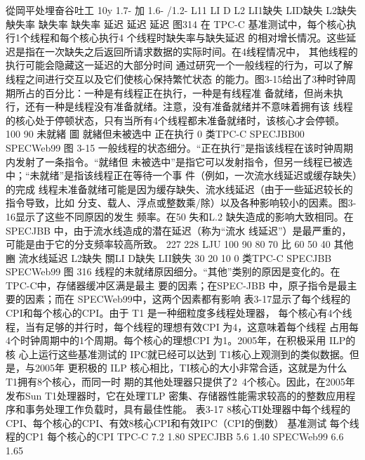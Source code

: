 從岡平处埋奋谷吐工
10y
1.7-
加 1.6-
/1.2-
L11
LI D
L2
LI1缺失 LID缺失 L2缺失
觖失率
缺失率
缺失率
延迟
延迟
延迟
图314
在 TPC-C 基准测试中，每个核心执行1个线程和每个核心执行4 个线程时缺失率与缺失延迟
的相对增长情况。这些延迟是指在一次缺失之后返回所请求数据的实际时间。在4线程情况中，
其他线程的执行可能会隐藏这一延迟的大部分时间
通过研究一个一般线程的行为，可以了解线程之间进行交互以及它们使核心保持繁忙状态
的能力。图3-15给出了3种时钟周期所占的百分比：一种是有线程正在执行，一种是有线程准
备就绪，但尚未执行，还有一种是线程没有准备就绪。注意，没有准备就绪并不意味着拥有该
线程的核心处于停顿状态，只有当所有4个线程都未准备就绪时，该核心才会停顿。
100%
90%
未就緒
圖 就緒但未被选中
正在执行
0%
类TPC-C
SPECJBB00
SPECWeb99
图 3-15 一般线程的状态细分。“正在执行”是指该线程在该时钟周期内发射了一条指令。“就绪但
未被选中”是指它可以发射指令，但另一线程已被选中；“未就绪”是指该线程正在等待一个事
件（例如，一次流水线延迟或缓存缺失）的完成
线程未准备就绪可能是因为缓存缺失、流水线延迟（由于一些延迟较长的指令导致，比如
分支、载人、浮点或整数乘/除）以及各种影响较小的因素。图3-16显示了这些不同原因的发生
频率。在50%
失和L.2 缺失造成的影响大致相同。在SPECJBB 中，由于流水线造成的潜在延迟（称为“流水
线延迟”）是最严重的，可能是由于它的分支频率较高所致。
227
228
LJU
100%
90%
80%
70%
比
60%
50%
40%
其他
豳 流水线延迟
L2缺失
關LI D缺失
LII鉠失
30%
20%
10%
0%
类TPC-C
SPECJBB
SPECWeb99
图 316 线程的未就绪原因细分。“其他”类别的原因是变化的。在 TPC-C中，存储器缓冲区满是最主
要的因素；在SPEC-JBB 中，原子指令是最主要的因素；而在 SPECWeb99中，这两个因素都有影响
表3-17显示了每个线程的CPI和每个核心的CPI。由于 T1 是一种细粒度多线程处理器，
每个核心有4个线程，当有足够的并行时，每个线程的理想有效CPI 为4，这意味着每个线程
占用每4个时钟周期中的1个周期。每个核心的理想CPI 为1。2005年，在积极采用 ILP的核
心上运行这些基准测试的 IPC就已经可以达到 T1核心上观测到的类似数据。但是，与2005年
更积极的 ILP 核心相比，TI核心的大小非常合适，这就是为什么 T1拥有8个核心，而同一时
期的其他处理器只提供了2~4个核心。因此，在2005年发布Sun T1处理器时，它在处理TLP
密集、存储器性能需求较高的的整数应用程序和事务处理工作负载时，具有最佳性能。
表3-17 8核心TI处理器中每个线程的CPI、每个核心的CPI、有效8核心CPI和有效IPC（CPI的倒数）
基准测试
每个线程的CP1
每个核心的CPI
TPC-C
7.2
1.80
SPECJBB
5.6
1.40
SPECWeb99
6.6
1.65

